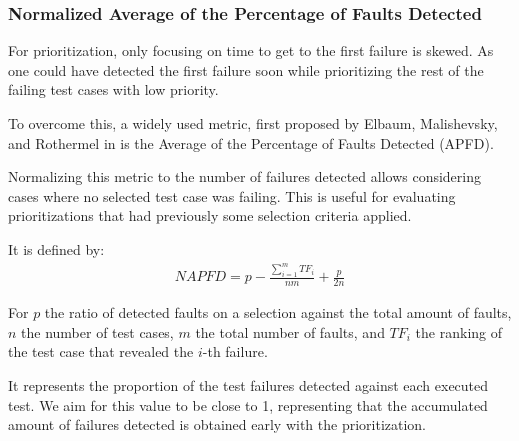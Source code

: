 \subsubsection{Normalized Average of the Percentage of Faults Detected}
For prioritization, only focusing on time to get to the first failure is skewed. As one could have detected the first failure
soon while prioritizing the rest of the failing test cases with low priority.

To overcome this, a widely used metric, first proposed by Elbaum, Malishevsky, and Rothermel in \cite{elbaum2002} is the 
Average of the Percentage of Faults Detected (APFD).

Normalizing this metric to the number of failures detected allows considering cases where no
selected test case was failing. This is useful for evaluating prioritizations that had previously some selection criteria applied.

It is defined by:
\begin{align*}
NAPFD = p - \frac{\sum_{i=1}^mTF_i}{nm} + \frac{p}{2n}
\end{align*}

For $p$ the ratio of detected faults on a selection against the total amount of faults,
$n$ the number of test cases, $m$ the total number of faults, and $TF_i$ the ranking of
the test case that revealed the $i$-th failure.

It represents the proportion of the test failures detected against each executed test.
We aim for this value to be close to 1, representing that the accumulated amount of 
failures detected is obtained early with the prioritization.